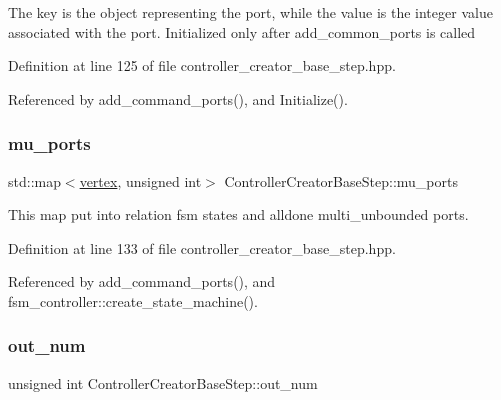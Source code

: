 The key is the object representing the port, while the value is the integer value associated with the port. Initialized only after add\+\_\+common\+\_\+ports is called 

Definition at line 125 of file controller\+\_\+creator\+\_\+base\+\_\+step.\+hpp.



Referenced by add\+\_\+command\+\_\+ports(), and Initialize().

\mbox{\label{classControllerCreatorBaseStep_aa977dc37a0cf88574c90ad4d4af78fb9}} 
\subsubsection{\texorpdfstring{mu\+\_\+ports}{mu\_ports}}
{\footnotesize\ttfamily std\+::map$<$\hyperlink{graph_8hpp_abefdcf0544e601805af44eca032cca14}{vertex}, unsigned int$>$ Controller\+Creator\+Base\+Step\+::mu\+\_\+ports\hspace{0.3cm}{\ttfamily [protected]}}



This map put into relation fsm states and alldone multi\+\_\+unbounded ports. 



Definition at line 133 of file controller\+\_\+creator\+\_\+base\+\_\+step.\+hpp.



Referenced by add\+\_\+command\+\_\+ports(), and fsm\+\_\+controller\+::create\+\_\+state\+\_\+machine().

\mbox{\label{classControllerCreatorBaseStep_a7f9f0f6879672a2cd603cbf7179edd86}} 
\subsubsection{\texorpdfstring{out\+\_\+num}{out\_num}}
{\footnotesize\ttfamily unsigned int Controller\+Creator\+Base\+Step\+::out\+\_\+num\hspace{0.3cm}{\ttfamily [protected]}}



